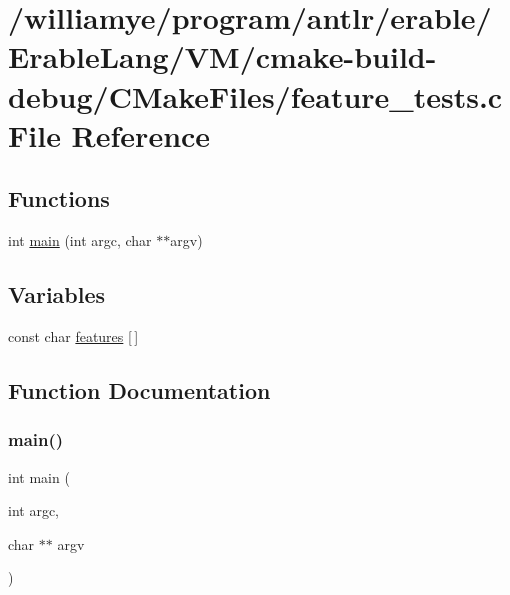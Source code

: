 \hypertarget{_v_m_2cmake-build-debug_2_c_make_files_2feature__tests_8c}{}\section{/williamye/program/antlr/erable/\+Erable\+Lang/\+V\+M/cmake-\/build-\/debug/\+C\+Make\+Files/feature\+\_\+tests.c File Reference}
\label{_v_m_2cmake-build-debug_2_c_make_files_2feature__tests_8c}
\subsection*{Functions}
\begin{DoxyCompactItemize}
\item 
int \mbox{\hyperlink{_v_m_2cmake-build-debug_2_c_make_files_2feature__tests_8c_a3c04138a5bfe5d72780bb7e82a18e627}{main}} (int argc, char $\ast$$\ast$argv)
\end{DoxyCompactItemize}
\subsection*{Variables}
\begin{DoxyCompactItemize}
\item 
const char \mbox{\hyperlink{_v_m_2cmake-build-debug_2_c_make_files_2feature__tests_8c_a1582568e32f689337602a16bf8a5bff0}{features}} \mbox{[}$\,$\mbox{]}
\end{DoxyCompactItemize}


\subsection{Function Documentation}
\mbox{\label{_v_m_2cmake-build-debug_2_c_make_files_2feature__tests_8c_a3c04138a5bfe5d72780bb7e82a18e627}} 
\subsubsection{\texorpdfstring{main()}{main()}}
{\footnotesize\ttfamily int main (\begin{DoxyParamCaption}\item[{int}]{argc,  }\item[{char $\ast$$\ast$}]{argv }\end{DoxyParamCaption})}



